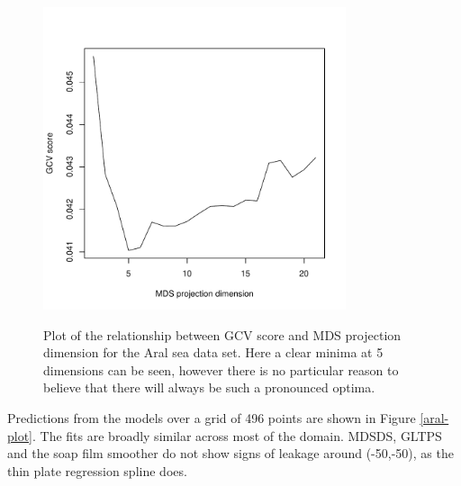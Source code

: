 \documentclass[smallextended]{svjour3}       %
\begin{document}
\begin{figure}
\centering
\includegraphics[width=3.5in]{examples/aral/aral-gcvplot.pdf} \\
\caption{Plot of the relationship between GCV score and MDS projection dimension for the Aral sea data set. Here a clear minima at 5 dimensions can be seen, however there is no particular reason to believe that there will always be such a pronounced optima.}
\label{aral-gcvplot}
\end{figure}

Predictions from the models over a grid of 496 points are shown in Figure \ref{aral-plot}. The fits are broadly similar across most of the domain. MDSDS, GLTPS and the soap film smoother do not show signs of leakage around (-50,-50), as the thin plate regression spline does.
\end{document}
